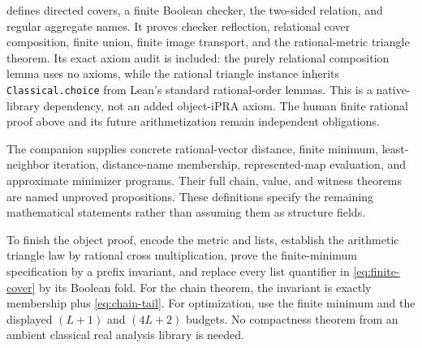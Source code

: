  defines directed covers, a finite
Boolean checker, the two-sided relation, and regular aggregate names.
It proves checker reflection, relational cover composition, finite union,
finite image transport, and the rational-metric triangle theorem.
Its exact axiom audit is included: the purely relational composition
lemma uses no axioms, while the rational triangle instance inherits
\texttt{Classical.choice} from Lean's standard rational-order lemmas.
This is a native-library dependency, not an added object-iPRA axiom.
The human finite rational proof above and its future arithmetization
remain independent obligations.

The companion  supplies concrete
rational-vector distance, finite minimum, least-neighbor iteration,
distance-name membership, represented-map evaluation, and approximate
minimizer programs. Their full chain, value, and witness theorems are
named unproved propositions. These definitions specify the remaining
mathematical statements rather than assuming them as structure fields.

To finish the object proof, encode the metric and lists, establish the
arithmetic triangle law by rational cross multiplication, prove the
finite-minimum specification by a prefix invariant, and replace every
list quantifier in \eqref{eq:finite-cover} by its Boolean fold. For the
chain theorem, the invariant is exactly membership plus
\eqref{eq:chain-tail}. For optimization, use the finite minimum and
the displayed $(L+1)$ and $(4L+2)$ budgets. No compactness theorem from
an ambient classical real analysis library is needed.
